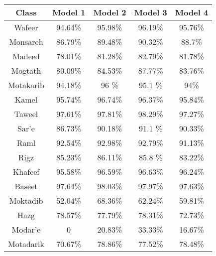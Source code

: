 \begin{center}
\begin{tabular}{|c|c|c||c|c|} 
\hline
Class & Model 1 & Model 2 & Model 3 & Model 4\\ 
\hline



   Wafeer    &   94.64\%   &  95.98\%    &  96.19\%   &  95.76\%  \\
   Monsareh  &   86.79\%   &  89.48\%    &  90.32\%   &  88.7\%  \\
   Madeed    &   78.01\%   &  81.28\%    &  82.79\%   &  81.78\%  \\
   Mogtath   &   80.09\%   &  84.53\%    &  87.77\%   &  83.76\%  \\
   Motakarib &   94.18\%   &  96   \%    &  95.1 \%   &  94\%  \\
   Kamel     &   95.74\%   &  96.74\%    &  96.37\%   &  95.84\%  \\
   Taweel    &   97.61\%   &  97.81\%    &  98.29\%   &  97.27\%  \\
   Sar'e     &   86.73\%   &  90.18\%    &  91.1 \%   &  90.33\%  \\
   Raml      &   92.54\%   &  92.98\%    &  92.79\%   &  91.13\%  \\
   Rigz      &   85.23\%   &  86.11\%    &  85.8 \%   &  83.22\%  \\
   Khafeef   &   95.58\%   &  96.59\%    &  96.63\%   &  96.24\%  \\
   Baseet    &   97.64\%   &  98.03\%    &  97.97\%   &  97.63\%  \\
   Moktadib  &   52.04\%   &  68.36\%    &  62.24\%   &  59.81\%  \\
   Hazg      &   78.57\%   &  77.79\%    &  78.31\%   &  72.73\%  \\
   Modar'e   &   0         &  20.83\%    &  33.33\%   &  16.67\%  \\
   Motadarik &   70.67\%   &  78.86\%    &  77.52\%   &  78.48\%  \\
\hline
\end{tabular}
\end{center}


